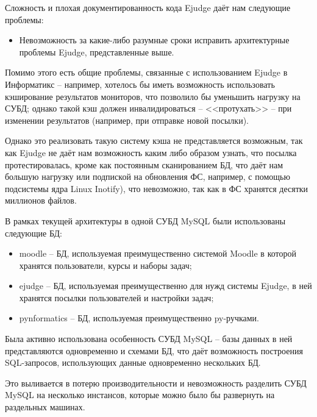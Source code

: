 Сложность и плохая документированность кода Ejudge даёт нам следующие проблемы:
\begin{itemize}
    \item Невозможность за какие-либо разумные сроки исправить архитектурные проблемы Ejudge, представленные выше.
\end{itemize}

Помимо этого есть общие проблемы, связанные с использованием Ejudge в Информатикс -- например, 
хотелось бы иметь возможность использовать кэширование результатов мониторов, что позволило бы уменьшить нагрузку на СУБД;
однако такой кэш должен инвалидироваться -- <<протухать>> -- при изменении результатов (например, при отправке новой посылки).

Однако это реализовать такую систему кэша не представляется возможным, 
так как Ejudge не даёт нам возможность каким либо образом узнать, что посылка протестировалась, 
кроме как постоянным сканированием БД, что даёт нам большую нагрузку
или подпиской на обновления ФС, например, с помощью подсистемы ядра Linux Inotify), \label{chap:inotify}
что невозможно, так как в ФС хранятся десятки миллионов файлов\cite{many_files}.

В рамках текущей архитектуры в одной СУБД MySQL были использованы следующие БД:
\begin{itemize}
    \item moodle -- БД, используемая преимущественно системой Moodle в которой хранятся пользователи, курсы и наборы задач;
    \item ejudge -- БД, используемая преимущественно для нужд системы Ejudge, в ней хранятся посылки пользователей и настройки задач;
    \item pynformatics -- БД, используемая преимущественно py-ручками.
\end{itemize}
Была активно использована особенность СУБД MySQL -- базы данных в ней представляются одновременно и схемами БД, 
что даёт возможность построения SQL-запросов, использующих данные одновременно нескольких БД.


Это выливается в потерю производительности и невозможность разделить СУБД MySQL на несколько инстансов, 
которые можно было бы развернуть на раздельных машинах.

